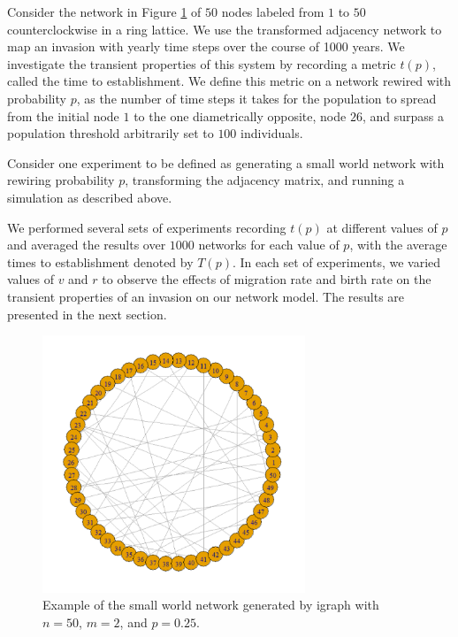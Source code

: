 \documentclass[12pt, openany]{book}
\theoremstyle{definition}
\theoremstyle{remark}
\numberwithin{equation}{chapter}
\numberwithin{figure}{chapter}
\begin{document}
Consider the network in Figure \ref{sample_smallworld} of $50$ nodes labeled from $1$ to $50$ counterclockwise in a ring lattice. We use the transformed adjacency network to map an invasion with yearly time steps over the course of 1000 years. We investigate the transient properties of this system by recording a metric $t(p)$, called the time to establishment. We define this metric on a network rewired with probability $p$, as the number of time steps it takes for the population to spread from the initial node $1$ to the one diametrically opposite, node $26$, and surpass a population threshold arbitrarily set to $100$ individuals.

Consider one experiment to be defined as generating a small world network with rewiring probability $p$, transforming the adjacency matrix, and running a simulation as described above.

We performed several sets of experiments recording $t(p)$ at different values of $p$ and averaged the results over $1000$ networks for each value of $p$, with the average times to establishment denoted by $T(p)$. In each set of experiments, we varied values of $v$ and $r$ to observe the effects of migration rate and birth rate on the transient properties of an invasion on our network model. The results are presented in the next section.

\begin{figure}[t!]
\begin{center}
       \includegraphics[width=0.7\textwidth]{sample_smallworld.png}
       \caption{Example of the small world network generated by igraph with $n = 50$, $m = 2$, and $p = 0.25$.\label{sample_smallworld}}
\end{center}
\end{figure}  
\end{document}
